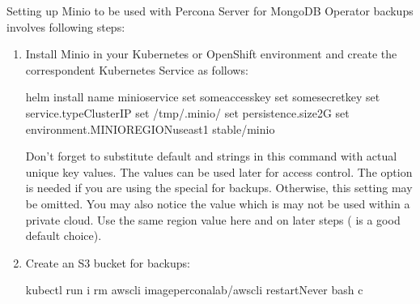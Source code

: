 \documentclass[letterpaper,10pt,english]{sphinxmanual}
\begin{document}
Setting up Minio to be used with Percona Server for MongoDB Operator
backups involves following steps:
\begin{enumerate}
%
\item {} 
Install Minio in your Kubernetes or OpenShift
environment and create the correspondent Kubernetes Service as
follows:

\begin{sphinxVerbatim}[commandchars=\\\{\}]
helm install 
  \PYGZhy{}\PYGZhy{}name minio\PYGZhy{}service 
  \PYGZhy{}\PYGZhy{}set some\PYGZhy{}access\PYGZhy{}key 
  \PYGZhy{}\PYGZhy{}set some\PYGZhy{}secret\PYGZhy{}key 
  \PYGZhy{}\PYGZhy{}set service.typeClusterIP 
  \PYGZhy{}\PYGZhy{}set /tmp/.minio/ 
  \PYGZhy{}\PYGZhy{}set persistence.size2G 
  \PYGZhy{}\PYGZhy{}set environment.MINIO\PYGZus{}REGIONus\PYGZhy{}east\PYGZhy{}1 
  stable/minio
\end{sphinxVerbatim}

Don’t forget to substitute default  and
 strings in this command with actual unique
key values. The values can be used later for access control. The  option is needed if you are using the special
for backups. Otherwise, this setting may be omitted. You may also notice the
 value which is may not be used within a private
cloud. Use the same region value here and on later steps
( is a good default choice).

\item {} 
Create an S3 bucket for backups:

\begin{sphinxVerbatim}[commandchars=\\\{\}]
kubectl run \PYGZhy{}i \PYGZhy{}\PYGZhy{}rm aws\PYGZhy{}cli \PYGZhy{}\PYGZhy{}imageperconalab/awscli \PYGZhy{}\PYGZhy{}restartNever \PYGZhy{}\PYGZhy{} 
 bash \PYGZhy{}c 
\end{sphinxVerbatim}


\end{enumerate}
\end{document}
